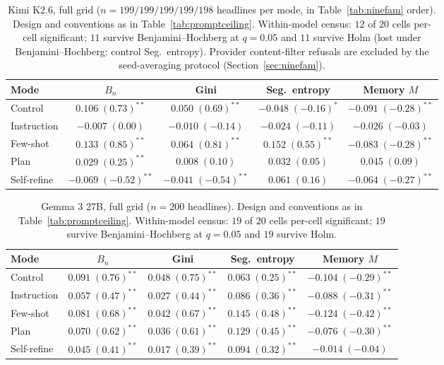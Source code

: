 \begin{table}[htbp]
\centering
\small
\caption{Kimi K2.6, full grid ($n=199/199/199/199/198$ headlines per mode, in Table~\ref{tab:ninefam} order). Design and conventions as in Table~\ref{tab:promptceiling}. Within-model census: $12$ of $20$ cells per-cell significant; $11$ survive Benjamini--Hochberg at $q=0.05$ and $11$ survive Holm (lost under Benjamini--Hochberg: control Seg.\ entropy). Provider content-filter refusals are excluded by the seed-averaging protocol (Section~\ref{sec:ninefam}).}
\label{tab:grid-kimi}
\begin{tabular}{lcccc}
\toprule
Mode & $B_n$ & Gini & Seg.\ entropy & Memory $M$ \\
\midrule
Control & $0.106\;(0.73)^{**}$ & $0.050\;(0.69)^{**}$ & $-0.048\;(-0.16)^{*}$ & $-0.091\;(-0.28)^{**}$ \\
Instruction & $-0.007\;(0.00)$ & $-0.010\;(-0.14)$ & $-0.024\;(-0.11)$ & $-0.026\;(-0.03)$ \\
Few-shot & $0.133\;(0.85)^{**}$ & $0.064\;(0.81)^{**}$ & $0.152\;(0.55)^{**}$ & $-0.083\;(-0.28)^{**}$ \\
Plan & $0.029\;(0.25)^{**}$ & $0.008\;(0.10)$ & $0.032\;(0.05)$ & $0.045\;(0.09)$ \\
Self-refine & $-0.069\;(-0.52)^{**}$ & $-0.041\;(-0.54)^{**}$ & $0.061\;(0.16)$ & $-0.064\;(-0.27)^{**}$ \\
\bottomrule
\end{tabular}
\end{table}

\begin{table}[htbp]
\centering
\small
\caption{Gemma 3 27B, full grid ($n=200$ headlines). Design and conventions as in Table~\ref{tab:promptceiling}. Within-model census: $19$ of $20$ cells per-cell significant; $19$ survive Benjamini--Hochberg at $q=0.05$ and $19$ survive Holm.}
\label{tab:grid-gemma}
\begin{tabular}{lcccc}
\toprule
Mode & $B_n$ & Gini & Seg.\ entropy & Memory $M$ \\
\midrule
Control & $0.091\;(0.76)^{**}$ & $0.048\;(0.75)^{**}$ & $0.063\;(0.25)^{**}$ & $-0.104\;(-0.29)^{**}$ \\
Instruction & $0.057\;(0.47)^{**}$ & $0.027\;(0.44)^{**}$ & $0.086\;(0.36)^{**}$ & $-0.088\;(-0.31)^{**}$ \\
Few-shot & $0.081\;(0.68)^{**}$ & $0.042\;(0.67)^{**}$ & $0.145\;(0.48)^{**}$ & $-0.124\;(-0.42)^{**}$ \\
Plan & $0.070\;(0.62)^{**}$ & $0.036\;(0.61)^{**}$ & $0.129\;(0.45)^{**}$ & $-0.076\;(-0.30)^{**}$ \\
Self-refine & $0.045\;(0.41)^{**}$ & $0.017\;(0.39)^{**}$ & $0.094\;(0.32)^{**}$ & $-0.014\;(-0.04)$ \\
\bottomrule
\end{tabular}
\end{table}

